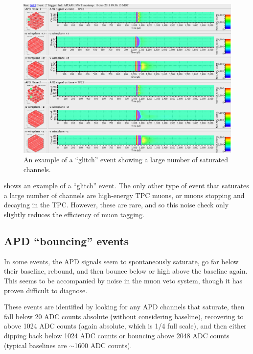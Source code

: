 \documentclass[herrin-thesis.tex]{subfiles}
\begin{document}
\begin{figure}[tbp]
\centering
\includegraphics[width=\columnwidth]{./plots/noise_eventdisplay_run_1683_ev_0002.png}
\caption{An example of a ``glitch'' event showing a large number of saturated channels.}
\label{fig:noise_glitch}
\end{figure}

 shows an example of a ``glitch'' event. The only other type of event that saturates a large number of channels are high-energy TPC muons, or  muons stopping and decaying in the TPC. However, these are rare, and so this noise check only slightly reduces the efficiency of muon tagging.

\subsection{APD ``bouncing'' events}
In some events, the APD signals seem to spontaneously saturate, go far below their baseline, rebound, and then bounce below or high above the baseline again. This seems to be accompanied by noise in the muon veto system, though it has proven difficult to diagnose.

These events are identified by looking for any APD channels that saturate, then fall below 20 ADC counts absolute (without considering baseline), recovering to above 1024 ADC counts (again absolute, which is 1/4 full scale), and then either dipping back below 1024 ADC counts or bouncing above 2048 ADC counts (typical baselines are \(\sim\)1600 ADC counts). 
\end{document}
